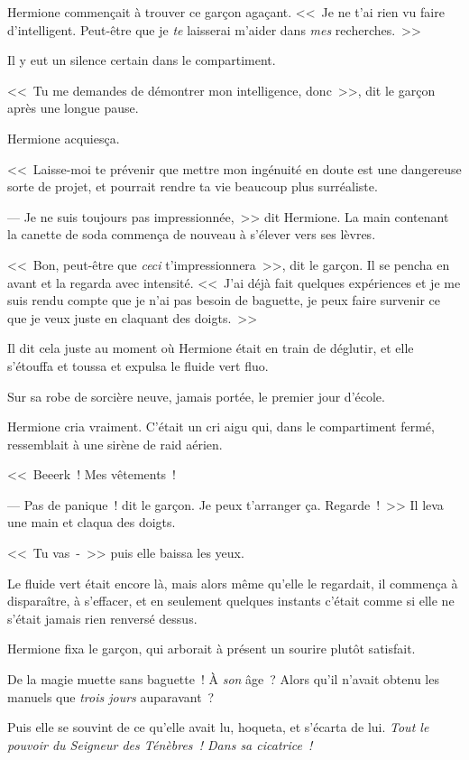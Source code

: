 Hermione commençait à trouver ce garçon agaçant. <<~Je ne t'ai rien vu faire d'intelligent. Peut-être que je \emph{te} laisserai m'aider dans \emph{mes} recherches.~>>

Il y eut un silence certain dans le compartiment.

<<~Tu me demandes de démontrer mon intelligence, donc~>>, dit le garçon après une longue pause.

Hermione acquiesça.

<<~Laisse-moi te prévenir que mettre mon ingénuité en doute est une dangereuse sorte de projet, et pourrait rendre ta vie beaucoup plus surréaliste.

--- Je ne suis toujours pas impressionnée,~>> dit Hermione. La main contenant la canette de soda commença de nouveau à s'élever vers ses lèvres.

<<~Bon, peut-être que \emph{ceci} t'impressionnera~>>, dit le garçon. Il se pencha en avant et la regarda avec intensité. <<~J'ai déjà fait quelques expériences et je me suis rendu compte que je n'ai pas besoin de baguette, je peux faire survenir ce que je veux juste en claquant des doigts.~>>

Il dit cela juste au moment où Hermione était en train de déglutir, et elle s'étouffa et toussa et expulsa le fluide vert fluo.

Sur sa robe de sorcière neuve, jamais portée, le premier jour d'école.

Hermione cria vraiment. C'était un cri aigu qui, dans le compartiment fermé, ressemblait à une sirène de raid aérien.

<<~Beeerk~! Mes vêtements~!

--- Pas de panique~! dit le garçon. Je peux t'arranger ça. Regarde~!~>> Il leva une main et claqua des doigts.

<<~Tu vas~-~>> puis elle baissa les yeux.

Le fluide vert était encore là, mais alors même qu'elle le regardait, il commença à disparaître, à s'effacer, et en seulement quelques instants c'était comme si elle ne s'était jamais rien renversé dessus.

Hermione fixa le garçon, qui arborait à présent un sourire plutôt satisfait.

De la magie muette sans baguette~! À \emph{son} âge~? Alors qu'il n'avait obtenu les manuels que \emph{trois jours} auparavant~?

Puis elle se souvint de ce qu'elle avait lu, hoqueta, et s'écarta de lui. \emph{Tout le pouvoir du Seigneur des Ténèbres~! Dans sa cicatrice~!}

